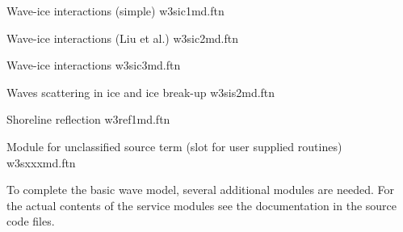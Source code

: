 \pb \noindent
Wave-ice interactions (simple) \hfill {\file w3sic1md.ftn}

\begin{flisti}
\end{flisti}

\noindent
Wave-ice interactions (Liu et al.) \hfill {\file w3sic2md.ftn}

\begin{flisti}
\end{flisti}

\noindent
Wave-ice interactions \cite{art:WS10} \hfill {\file w3sic3md.ftn}

\begin{flisti}
\end{flisti}

\begin{flisti}
\end{flisti}

\noindent
Waves scattering in ice and ice break-up \hfill {\file w3sis2md.ftn}

\noindent
Shoreline reflection \hfill {\file w3ref1md.ftn}

\begin{flisti}
\end{flisti}

\noindent
Module for unclassified source term (slot for user supplied routines) \hfill
{\file w3sxxxmd.ftn}

\begin{flisti}
\end{flisti}

\noindent
To complete the basic wave model, several additional modules are needed. For
the actual contents of the service modules see the documentation in the source
code files.

